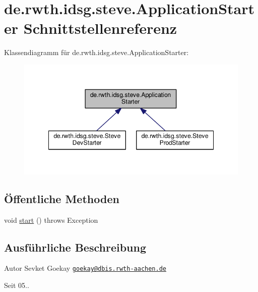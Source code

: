 \hypertarget{interfacede_1_1rwth_1_1idsg_1_1steve_1_1_application_starter}{\section{de.\+rwth.\+idsg.\+steve.\+Application\+Starter Schnittstellenreferenz}
\label{interfacede_1_1rwth_1_1idsg_1_1steve_1_1_application_starter}
}


Klassendiagramm für de.\+rwth.\+idsg.\+steve.\+Application\+Starter\+:\nopagebreak
\begin{figure}[H]
\begin{center}
\leavevmode
\includegraphics[width=348pt]{interfacede_1_1rwth_1_1idsg_1_1steve_1_1_application_starter__inherit__graph}
\end{center}
\end{figure}
\subsection*{Öffentliche Methoden}
\begin{DoxyCompactItemize}
\item 
void \hyperlink{interfacede_1_1rwth_1_1idsg_1_1steve_1_1_application_starter_ad6461bffb2faebb821cadba517773b77}{start} ()  throws Exception
\end{DoxyCompactItemize}


\subsection{Ausführliche Beschreibung}
\begin{DoxyAuthor}{Autor}
Sevket Goekay \href{mailto:goekay@dbis.rwth-aachen.de}{\tt goekay@dbis.\+rwth-\/aachen.\+de} 
\end{DoxyAuthor}
\begin{DoxySince}{Seit}
05.. 
\end{DoxySince}


